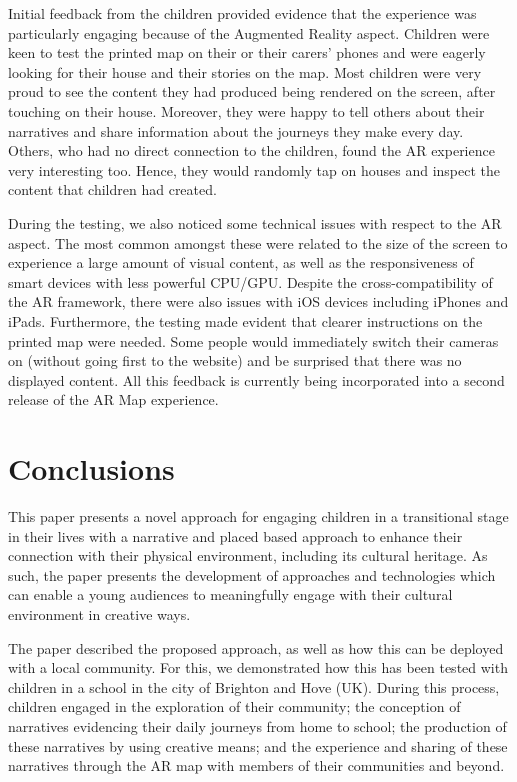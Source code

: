 \documentclass[acmlarge,screen,dvipsnames]{acmart}
\begin{document}
Initial feedback from the children provided evidence that the experience was
particularly engaging because of the Augmented Reality aspect. Children were keen to test
the printed map on their or their carers' phones and were eagerly looking for their house and their stories on the map.
Most children were very proud to see the content they had produced being
rendered on the screen, after touching on their house. Moreover, they were happy to tell
others about their narratives and share information about the journeys they make every day. Others, who had no
direct connection to the children, found the AR experience very interesting too.
Hence, they would randomly tap on houses and inspect the content that children had created.
 
 During the testing, we also noticed some technical issues with respect to the AR aspect. The
 most common amongst these were related to the size of the screen to experience a large
 amount of visual content, as well as the responsiveness of smart devices with less
 powerful CPU/GPU. Despite the cross-compatibility of the AR framework, there
 were also issues with iOS devices including iPhones and iPads. Furthermore,
 the testing made evident that clearer instructions on the printed map
 were needed. Some people would immediately switch their cameras on (without
 going first to the website) and be surprised that there was no displayed content. All this feedback is currently being incorporated into a second release of the AR Map experience. 


\section{Conclusions} \label{conc} 
\color{blue}
This paper presents a novel approach for engaging children in a transitional stage in their lives with a narrative and placed based approach to enhance their connection with their physical environment, including its cultural heritage. As such, the paper presents the development of approaches and technologies which can enable a young audiences to
meaningfully engage with their cultural environment in creative ways. 

The paper described the proposed approach, as well as how this can be deployed 
with a local community. For this, we demonstrated how this has been tested with children in a school in the city of Brighton and Hove (UK). During this process, children
engaged in the exploration of their community; the conception of narratives evidencing their daily journeys from home to school; the production of these narratives by using creative means; and the experience and sharing of these narratives through the AR map with members of their communities and beyond.
\end{document}
